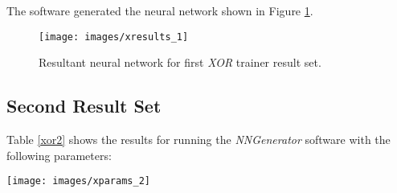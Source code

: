The software generated the neural network shown in Figure \ref{xresults_1}.

\begin{figure}[hbt!]
  \centering
  \texttt{[image: images/xresults\_1]}
  \caption{Resultant neural network for first {\it XOR} trainer result set.}
  \label{xresults_1}
\end{figure}

\subsection{Second Result Set}

Table \ref{xor2} shows the results for running the {\it NNGenerator}
software with the following parameters: 

\begin{center}
\texttt{[image: images/xparams\_2]}
\end{center}

